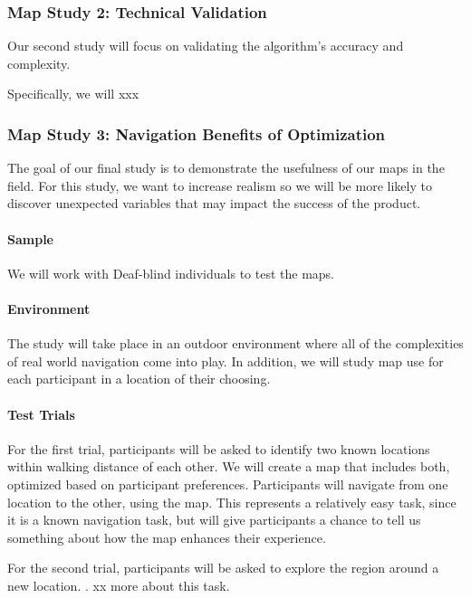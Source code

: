 \subsubsection{Map Study 2: Technical Validation}
\label{sec:technical-validation}
Our second study will focus on validating the algorithm's accuracy and complexity. 

Specifically, we will xxx


\subsubsection{Map Study 3: Navigation Benefits of Optimization}
\label{sec:field-map}
The goal of our final study is to demonstrate the usefulness of our maps in the field. For this study, we want to increase realism so we will be more likely to discover unexpected variables that may impact the success of the product. 

\paragraph{Sample}
We will work with Deaf-blind individuals to test the maps. 

\paragraph{Environment}
The study will take place in an outdoor environment where all of the complexities of real world navigation come into play. In addition, we will study map use for each participant in a location of their choosing.

\paragraph{Test Trials}
For the first trial, participants will be asked to identify two known locations within walking distance of each other. We will create a map that includes both, optimized based on participant preferences. Participants will navigate from one location to the other, using the map. This represents a relatively easy task, since it is a known navigation task, but will give participants a chance to tell us something about how the map enhances their experience.

For the second trial, participants will be asked to explore the region around a new location. . xx more about this task.